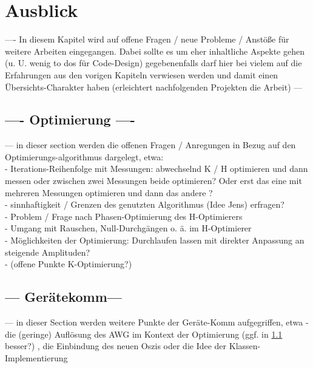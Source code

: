 \documentclass[../Report.tex]{subfiles}
\begin{document}
\chapter{Ausblick}
\label{chap:ausb}
---- In diesem Kapitel wird auf offene Fragen / neue Probleme / Anstöße für weitere Arbeiten eingegangen. Dabei sollte es um eher inhaltliche Aspekte gehen (u. U. wenig to dos für Code-Design) gegebenenfalls darf hier bei vielem auf die Erfahrungen aus den vorigen Kapiteln verwiesen werden und damit einen Übersichts-Charakter haben (erleichtert nachfolgenden Projekten die Arbeit) --- 

\section{---- Optimierung ----}
\label{sec:ausb.opti}
--- in dieser section werden die offenen Fragen / Anregungen in Bezug auf den Optimierungs-algorithmus dargelegt, etwa: \\
- Iterations-Reihenfolge mit Messungen: abwechselnd K / H optimieren und dann messen oder zwischen zwei Messungen beide optimieren? Oder erst das eine mit mehreren Messungen optimieren und dann das andere ?
\\
- sinnhaftigkeit / Grenzen des genutzten Algorithmus (Idee Jens) erfragen?
\\
- Problem / Frage nach Phasen-Optimierung des H-Optimierers
\\
- Umgang mit Rauschen, Null-Durchgängen o. ä. im H-Optimierer
\\
- Möglichkeiten der Optimierung: Durchlaufen lassen mit direkter Anpassung an steigende Amplituden? 
\\
- (offene Punkte K-Optimierung?)

\section{--- Gerätekomm---}
\label{sec:ausb.geraete}
--- in dieser Section werden weitere Punkte der Geräte-Komm aufgegriffen, etwa - die (geringe) Auflösung des AWG im Kontext der Optimierung (ggf. in \ref{sec:ausb.opti} besser?) , die Einbindung des neuen Oszis oder die Idee der Klassen-Implementierung 

\end{document}
